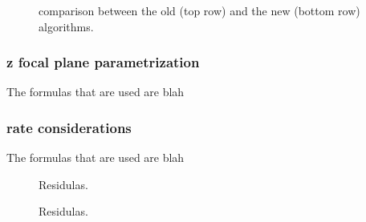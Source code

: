 \begin{figure}[t]
  \centering
  \begin{subfigure}{0.5\textwidth}
    \scalebox{.6}{}
    \caption{}
    \label{mvTTm_chi2}
  \end{subfigure}%
  \hfill%
  \begin{subfigure}{0.5\textwidth}
    \scalebox{.6}{}
    \caption{}
    \label{mvm_chi2}
  \end{subfigure}
  \caption{\chisq comparison between the old \mvm (top row) and the new \mvTTm (bottom row) algorithms.}
 \label{mvm_chi2_comp}
\end{figure}

\subsubsection{z focal plane parametrization}
The formulas that are used are blah

\subsubsection{\hltone rate considerations}
The formulas that are used are blah


\begin{figure}[t]
  \centering
  \begin{subfigure}{0.5\textwidth}
    \scalebox{.6}{}
    \caption{}
    \label{mvTTm_res_x}
  \end{subfigure}%
  \hfill%
  \begin{subfigure}{0.5\textwidth}
    \scalebox{.6}{}
    \caption{}
    \label{mvm_res_y}
  \end{subfigure}
  \caption{Residulas.  }
 \label{mvm_res}
\end{figure}

\begin{figure}[t]
  \centering
  \begin{subfigure}{0.5\textwidth}
    \scalebox{.6}{}
    \caption{}
    \label{mvTTm_res_x}
  \end{subfigure}%
  \hfill%
  \begin{subfigure}{0.5\textwidth}
    \scalebox{.6}{}
    \caption{}
    \label{mvm_res_y}
  \end{subfigure}
  \caption{Residulas.  }
 \label{mvm_res}
\end{figure}

